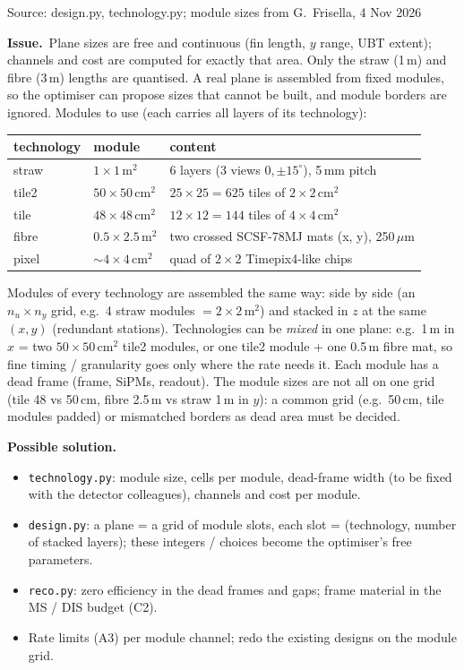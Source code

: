 \documentclass[10pt,a4paper]{article}
\newcommand{\st}[1]{\textbf{#1}}
\newcommand{\stOPEN}{\textcolor{shorange}{\st{OPEN}}}
\newenvironment{issue}[5]{%
  \begin{tcolorbox}[breakable,colback=white,colframe=cernblue,boxrule=0.6pt,arc=1.5mm,
    left=6pt,right=6pt,top=4pt,bottom=4pt,
    title={\textbf{#1}\quad #2\hfill{\normalfont\small priority #3\quad\colorbox{white}{#4}}},
    coltitle=white,colbacktitle=cernblue,fonttitle=\normalsize]
  {\color{greytxt}\footnotesize Source: #5}\par\smallskip}{\end{tcolorbox}\vspace{2pt}}
\newcommand{\prob}{\par\noindent\textbf{\color{cernblue}Issue.}\ }
\newcommand{\sol}{\par\smallskip\noindent\textbf{\color{shorange}Possible solution.}\ }
\begin{document}
\begin{issue}{A7}{Detector planes have no predefined module dimensions}{A}{\stOPEN}{design.py, technology.py; module sizes from G.~Frisella, 4 Nov 2026}
\prob Plane sizes are free and continuous (fin length, $y$ range, UBT extent); channels and cost are computed for
exactly that area. Only the straw (1\,m) and fibre (3\,m) lengths are quantised. A real plane is assembled from fixed
modules, so the optimiser can propose sizes that cannot be built, and module borders are ignored.
Modules to use (each carries all layers of its technology):

\smallskip
\begin{tabular}{@{}lll@{}}
\toprule
technology & module & content\\\midrule
straw & $1\times1$\,m$^2$ & 6 layers (3 views $0,\pm15^\circ$), 5\,mm pitch\\
tile2 & $50\times50$\,cm$^2$ & $25\times25=625$ tiles of $2\times2$\,cm$^2$\\
tile & $48\times48$\,cm$^2$ & $12\times12=144$ tiles of $4\times4$\,cm$^2$\\
fibre & $0.5\times2.5$\,m$^2$ & two crossed SCSF-78MJ mats (x, y), 250\,$\mu$m\\
pixel & $\sim4\times4$\,cm$^2$ & quad of $2\times2$ Timepix4-like chips\\
\bottomrule
\end{tabular}
\smallskip

\noindent Modules of every technology are assembled the same way: side by side (an $n_u\times n_y$ grid, e.g.\ 4 straw
modules $=2\times2$\,m$^2$) and stacked in $z$ at the same $(x,y)$ (redundant stations). Technologies can be
\emph{mixed} in one plane: e.g.\ 1\,m in $x$ = two $50\times50$\,cm$^2$ tile2 modules, or one tile2 module + one
0.5\,m fibre mat, so fine timing / granularity goes only where the rate needs it. Each module has a dead frame
(frame, SiPMs, readout). The module sizes are not all on one grid (tile 48 vs 50\,cm, fibre 2.5\,m vs straw 1\,m in
$y$): a common grid (e.g.\ 50\,cm, tile modules padded) or mismatched borders as dead area must be decided.
\sol
\begin{itemize}
\item \texttt{technology.py}: module size, cells per module, dead-frame width (to be fixed with the detector
      colleagues), channels and cost per module.
\item \texttt{design.py}: a plane = a grid of module slots, each slot = (technology, number of stacked layers);
      these integers / choices become the optimiser's free parameters.
\item \texttt{reco.py}: zero efficiency in the dead frames and gaps; frame material in the MS / DIS budget (C2).
\item Rate limits (A3) per module channel; redo the existing designs on the module grid.
\end{itemize}
\end{issue}
\end{document}
